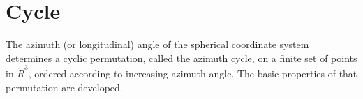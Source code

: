 %
%
%






\section{Cycle}


The azimuth (or longitudinal) angle of the spherical coordinate system
determines a cyclic permutation, called the azimuth cycle, on a finite
set of points in $\ring{R}^3$, ordered according to increasing azimuth
angle.  The basic properties of that permutation are developed.
%
%
%


